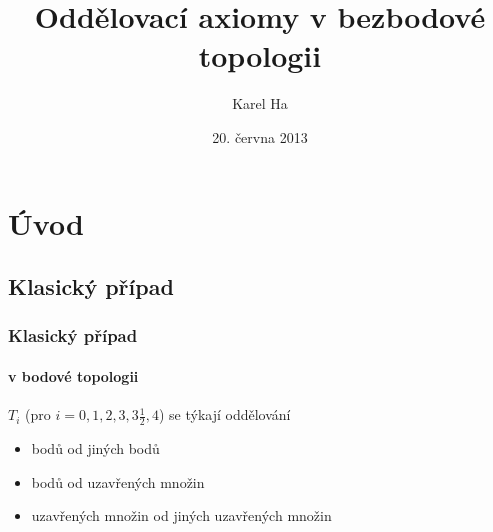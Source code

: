 \documentclass[mathserif]{beamer}
\title[Oddělovací axiomy]{Oddělovací axiomy v bezbodové topologii} %
\author{Karel Ha} %
\institute[MFF UK] %
{
Matematicko-fyzikální fakulta, \\
Univerzita Karlova v Praze \\ %
}
\date{20. června 2013} %
\begin{document}
\begin{frame}
\titlepage %
\end{frame}



\section{Úvod} %

\subsection{Klasický případ}

\begin{frame}
\frametitle{Klasický případ}
\framesubtitle{v bodové topologii}
\pause

{\color{blue}{Oddělovací axiomy} $T_i$} (pro $i = 0, 1, 2, 3, 3\frac{1}{2}, 4$)
se týkají oddělování
\pause

\begin{itemize}[<+->]
  \item bodů od jiných bodů
  \item bodů od uzavřených množin
  \item uzavřených množin od jiných uzavřených množin
\end{itemize}

\end{frame}
\end{document}
